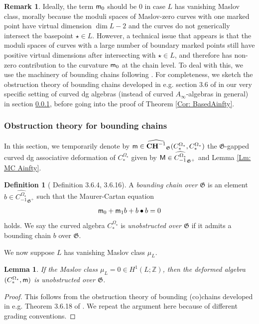 \documentclass[10pt]{amsart}
\numberwithin{equation}{section}
\theoremstyle{plain}
\newtheorem{lemma}[theorem]{Lemma}
\theoremstyle{definition}
\newtheorem{definition}[theorem]{Definition}
\newtheorem{remark}[theorem]{Remark}
\theoremstyle{remark}
\numberwithin{equation}{section}
\newcommand{\Z}{\mathbb{Z}}
\newcommand{\wh}[1]{\widehat{#1}}
\newcommand{\mf}[1]{\mathfrak{#1}}
\newcommand{\CC}{\textbf{\textup{CH}}}
\newcommand{\CBa}{C_*^{\Omega_\star}}
\newcommand{\Cba}[1]{C_{#1}^{\Omega_\star}}
\newcommand{\MM}{\textup{\textsf{M}}}
\newcommand{\mm}{\textup{\textsf{m}}}
\begin{document}
{\begin{remark}
Ideally, the term $\mm_0$ should be 0 in case $L$ has vanishing Maslov class, morally because the moduli spaces of Maslov-zero curves with one marked point have virtual dimension $\dim L -2$ and the curves do not generically intersect the basepoint $\star\in L$. However, a technical issue that appears is that the moduli spaces of curves with a large number of boundary marked points still have positive virtual dimensions after intersecting with $\star\in L$, and therefore has non-zero contribution to the curvature $\mm_0$ at the chain level. 
To deal with this, we use the machinery of bounding chains following \cite{FOOO1}.
For completeness, we sketch the obstruction theory of bounding chains developed in e.g. section 3.6 of \cite{FOOO1} in our very specific setting of curved dg algebras (instead of curved $A_\infty$-algebras in general) in section \ref{Subsc: BoundingChain}, before going into the proof of Theorem \ref{Cor: BasedAinfty}.
\end{remark}

\subsubsection{Obstruction theory for bounding chains}\label{Subsc: BoundingChain}
In this section, we temporarily denote by $\mm \in \wh{\CC^{-1}}_\mf{G}(\CBa,\CBa)$ the $\mf{G}$-gapped curved dg associative deformation of $\CBa$ given by $\MM\in \wh{\Cba{-1}}_{\mf{G}^+}$ and Lemma \ref{Lm: MC Ainfty}. 
	\begin{definition}[\cite{FOOO1} Definition 3.6.4, 3.6.16]
	A \emph{bounding chain over $\mathfrak{G}$} is an element $b\in \wh{\Cba{-1}}_{\mathfrak{G}^+}$ such that the Maurer-Cartan equation\begin{align}\label{Eq: BoundingChain}
		\mm_0 + \mm_1 b + b\bullet b = 0
	\end{align}holds. We say the curved algebra $\CBa$ is \emph{unobstructed over $\mf{G}$} if it admits a bounding chain $b$ over $\mf{G}$.
\end{definition}




We now suppose $L$ has vanishing Maslov class $\mu_L$.
\begin{lemma}\label{Lm: BoundingChain}
	If the Maslov class $\mu_L= 0 \in H^1(L;\Z)$, then the deformed algebra $(\CBa, \mm)$ is unobstructed over $\mf{G}$.
\end{lemma}
\begin{proof}
	This follows from the obstruction theory of bounding (co)chains developed in e.g. Theorem 3.6.18 of \cite{FOOO1}. We repeat the argument here because of different grading conventions.
	

\end{proof}}
\end{document}
